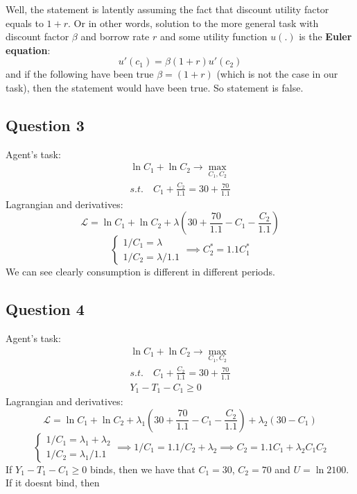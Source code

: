 \documentclass[11pt, oneside]{article}
\begin{document}
Well, the statement is latently assuming the fact that discount utility factor equals to $ 1 + r $. Or in other words, solution to the more general task with discount factor $ \beta $ and borrow rate $ r $ and some utility function $ u(.) $ is the \textbf{Euler equation}:
\[u'(c_{1}) = \beta (1+r)u'(c_{2})\]
and if the following have been true $ \beta = (1+r)  $ (which is not the case in our task), then the statement would have been true. So statement is false.

\subsection*{Question 3}

Agent's task:
\begin{gather*}
	\ln C_{1} + \ln C_{2} \to \max_{C_{1}, C_{2}} \\
	s.t. \quad C_{1} + \frac{C_{2}}{1.1} = 30 + \frac{70}{1.1}
\end{gather*}
Lagrangian and derivatives:
\[
\mathcal{L} = 	\ln C_{1} + \ln C_{2} + \lambda \left( 30 + \frac{70}{1.1} - C_{1} - \frac{C_{2}}{1.1} \right)
\]
\[
\begin{cases}
1/C_{1} = \lambda \\
1/C_{2} = \lambda / 1.1
\end{cases} \implies C^{*}_{2} = 1.1C^{*}_{1}
\]
We can see clearly consumption is different in different periods.

\subsection*{Question 4}
Agent's task:
\begin{gather*}
\ln C_{1} + \ln C_{2} \to \max_{C_{1}, C_{2}} \\
s.t. \quad C_{1} + \frac{C_{2}}{1.1} = 30 + \frac{70}{1.1} \\
Y_{1} - T_{1} - C_{1} \ge 0
\end{gather*}
Lagrangian and derivatives:
\[
\mathcal{L} = 	\ln C_{1} + \ln C_{2} + \lambda_{1} \left( 30 + \frac{70}{1.1} - C_{1} - \frac{C_{2}}{1.1} \right) + \lambda_{2} \left( 30 - C_{1} \right)
\]
\[
\begin{cases}
1/C_{1} = \lambda_{1} + \lambda_{2} \\
1/C_{2} = \lambda_{1} / 1.1
\end{cases} \implies 1/C_{1} = 1.1/C_{2} + \lambda_{2} \implies C_{2} = 1.1C_{1} + \lambda_{2}C_{1}C_{2}
\]
If $ Y_{1} - T_{1} - C_{1} \ge 0 $ binds, then we have that $ C_{1} = 30 $, $ C_{2}  = 70$ and $ U = \ln 2100 $. If it doesnt bind, then 
\end{document}
